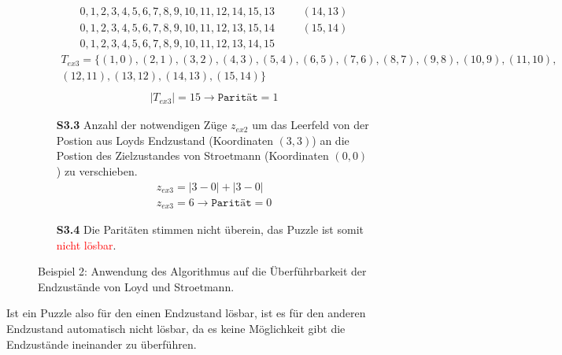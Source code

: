 \begin{figure}[H]
\begin{enumerate}
\begin{align*}
			      0,1,2,3,4,5,6,7,8,9,10,11,12,14,15,13 & \hspace{20pt} (14,13) \\
			      0,1,2,3,4,5,6,7,8,9,10,11,12,13,15,14 & \hspace{20pt} (15,14) \\
			      0,1,2,3,4,5,6,7,8,9,10,11,12,13,14,15
		      \end{align*}
		      \begin{align*}
			      T_{ex3} = \{(1,0),(2,1),(3,2),(4,3),(5,4),(6,5),(7,6),(8,7),(9,8),(10,9),(11,10), \\(12,11),(13,12),(14,13),(15,14)\}\\
		      \end{align*}
		      \begin{align*}
			      \left\vert T_{ex3}\right\vert = 15 \rightarrow \texttt{Parität} = 1
		      \end{align*}
		\item[\textbf{S3.3}] Anzahl der notwendigen Züge $z_{ex2}$ um das Leerfeld von der Postion aus Loyds Endzustand (Koordinaten $(3,3)$) an die Postion des Zielzustandes von Stroetmann (Koordinaten $(0,0)$) zu verschieben.
		      \begin{align*}
			      z_{ex3} = \left | 3 - 0 \right | + \left | 3 - 0 \right | \\
			      z_{ex3} = 6 \rightarrow \texttt{Parität} = 0
		      \end{align*}
		\item[\textbf{S3.4}] Die Paritäten stimmen nicht überein, das Puzzle ist somit \textcolor{red}{nicht lösbar}.
	\end{enumerate}
	\caption{Beispiel 2: Anwendung des Algorithmus auf die Überführbarkeit der Endzustände von Loyd und Stroetmann. \label{fig:Ex3_algo}}
\end{figure}
Ist ein Puzzle also für den einen Endzustand lösbar, ist es für den anderen Endzustand automatisch nicht lösbar, da es keine Möglichkeit gibt die Endzustände ineinander zu überführen.

